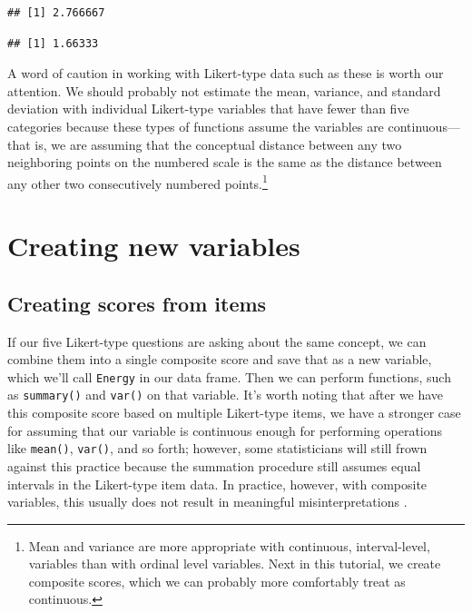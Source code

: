 \documentclass[
]{book}
\newenvironment{Shaded}{\begin{snugshade}}{\end{snugshade}}
\newcommand{\KeywordTok}[1]{\textcolor[rgb]{0.13,0.29,0.53}{\textbf{#1}}}
\newcommand{\NormalTok}[1]{#1}
\newcommand{\OperatorTok}[1]{\textcolor[rgb]{0.81,0.36,0.00}{\textbf{#1}}}
\begin{document}
\begin{verbatim}
## [1] 2.766667
\end{verbatim}

\begin{Shaded}
\end{Shaded}

\begin{verbatim}
## [1] 1.66333
\end{verbatim}

A word of caution in working with Likert-type data such as these is worth our attention. We should probably not estimate the mean, variance, and standard deviation with individual Likert-type variables that have fewer than five categories because these types of functions assume the variables are continuous---that is, we are assuming that the conceptual distance between any two neighboring points on the numbered scale is the same as the distance between any other two consecutively numbered points.\footnote{Mean and variance are more appropriate with continuous, interval-level, variables than with ordinal level variables. Next in this tutorial, we create composite scores, which we can probably more comfortably treat as continuous.}

\hypertarget{appending}{%
\chapter{Creating new variables}\label{appending}}

\hypertarget{creating-scores-from-items}{%
\section{Creating scores from items}\label{creating-scores-from-items}}

If our five Likert-type questions are asking about the same concept, we can combine them into a single composite score and save that as a new variable, which we'll call \texttt{Energy} in our data frame. Then we can perform functions, such as \texttt{summary()} and \texttt{var()} on that variable. It's worth noting that after we have this composite score based on multiple Likert-type items, we have a stronger case for assuming that our variable is continuous enough for performing operations like \texttt{mean()}, \texttt{var()}, and so forth; however, some statisticians will still frown against this practice because the summation procedure still assumes equal intervals in the Likert-type item data. In practice, however, with composite variables, this usually does not result in meaningful misinterpretations \citep[\citet{norman_likert_2010}]{carifio_resolving_2008}.
\end{document}
